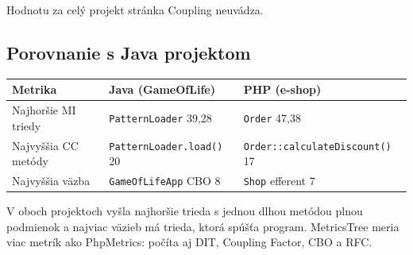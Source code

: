 Hodnotu za celý projekt stránka Coupling neuvádza.

\subsection*{Porovnanie s Java projektom}

\begin{center}
\begin{tabular}{lll}
\toprule
Metrika & Java (GameOfLife) & PHP (e-shop) \\
\midrule
Najhoršie MI triedy & \texttt{PatternLoader} 39,28 & \texttt{Order} 47,38 \\
Najvyššia CC metódy & \texttt{PatternLoader.load()} 20 & \texttt{Order::calculateDiscount()} 17 \\
Najvyššia väzba & \texttt{GameOfLifeApp} CBO 8 & \texttt{Shop} efferent 7 \\
\bottomrule
\end{tabular}
\end{center}

V oboch projektoch vyšla najhoršie trieda s jednou dlhou metódou plnou podmienok a najviac väzieb má trieda, ktorá spúšťa program. MetricsTree meria viac metrík ako PhpMetrics: počíta aj DIT, Coupling Factor, CBO a RFC.


